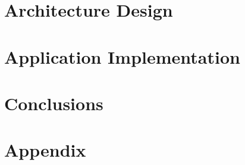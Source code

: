 \documentclass{report}
\begin{document}
\chapter{Architecture Design}


% 

\chapter{Application Implementation}


\chapter{Conclusions}


{}


\chapter{Appendix}

\end{document}
